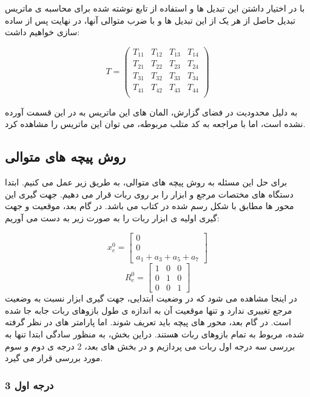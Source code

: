 با در اختیار داشتن این تبدیل ها و استفاده از تابع نوشته شده برای محاسبه ی ماتریس تبدیل حاصل از هر یک از این تبدیل ها و با ضرب متوالی آنها، در نهایت پس از ساده سازی خواهیم داشت:

\[
T = \begin{pmatrix}
	T_{11} & T_{12} & T_{13} & T_{14} \\
	T_{21} & T_{22} & T_{23} & T_{24} \\
	T_{31} & T_{32} & T_{33} & T_{34} \\
	T_{41} & T_{42} & T_{43} & T_{44} \\
\end{pmatrix}
\]

به دلیل محدودیت در فضای گزارش، المان های این ماتریس به در این قسمت آورده نشده است، اما با مراجعه به کد متلب مربوطه، می توان این ماتریس را مشاهده کرد.

\subsection{روش پیچه های متوالی}
برای حل این مسئله به روش پیچه های متوالی، به طریق زیر عمل می کنیم.
ابتدا دستگاه های مختصات مرجع و ابزار را بر روی ربات قرار می دهیم. جهت گیری این محور ها مطابق با شکل رسم شده در کتاب می باشد.
در گام بعد، موقعیت و جهت گیری اولیه ی ابزار ربات را به صورت زیر به دست می آوریم:

\[
x_e^0 = \begin{bmatrix}
	0 \\
	0 \\
	a_1 + a_3 + a_5 + a_7
\end{bmatrix}
\]
\[
R_e^0 = \begin{bmatrix}
	1 & 0 & 0 \\
	0 & 1 & 0 \\
	0 & 0 & 1
\end{bmatrix}
\]
در اینجا مشاهده می شود که در وضعیت ابتدایی، جهت گیری ابزار نسبت به وضعیت مرجع تغییری ندارد و تنها موقعیت آن به اندازه ی طول بازوهای ربات جابه جا شده است.
در گام بعد، محور های پیچه باید تعریف شوند.
اما پارامتر های در نظر گرفته شده، مربوط به تمام بازوهای ربات هستند. دراین بخش، به منظور سادگی ابتدا تنها به بررسی سه درجه اول ربات می پردازیم و در بخش های بعد، 2 درجه ی دوم و سوم مورد بررسی قرار می گیرد.
\subsubsection{3 درجه اول}

